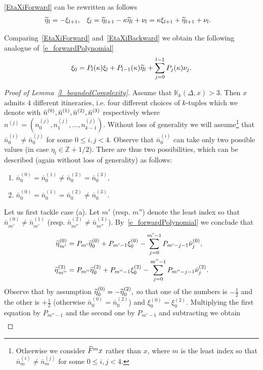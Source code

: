 \documentclass[10pt]{amsart}
\theoremstyle{definition}\newtheorem{defi}[theo]{Definition}\newtheorem{rema}[theo]{Remark}\newtheorem{exam}[theo]{Example}\newtheorem{exem}[theo]{Example}\newtheorem{nota}[theo]{Notation}
\newcommand{\bZ}{\mathbb{Z}}
\newcommand{\LC}{\mathbb{K}}
\newcommand{\nf}{\hat F}
\newcommand{\dn}{\nu}
\newcommand{\indexItinPrivate}[1]{^{(#1)}}
\newcommand{\dnt}[1]{\bar\nu\indexItinPrivate{#1}}
\newcommand{\nt}[1]{\bar n\indexItinPrivate{#1}}
\newcommand{\xit}[1]{\xi\indexItinPrivate{#1}}
\newcommand{\teta}{\tilde\eta}
\newcommand{\tetat}[1]{\teta\indexItinPrivate{#1}}
\newcommand*\DS{\displaystyle}
\newcommand*{\relabel}{\renewcommand{\labelenumi}{(\theenumi)}}
\newcommand*{\alphenumi}{\renewcommand*{\theenumi}{\alph{enumi}}\relabel}
\let\oldtilde\tilde
\renewcommand*{\tilde}[1]{\mathchoice{\widetilde{#1}}{\widetilde{#1}}{\oldtilde{#1}}{\oldtilde{#1}}}
\let\oldhat\hat
\renewcommand*{\hat}[1]{\mathchoice{\widehat{#1}}{\widehat{#1}}{\oldhat{#1}}{\oldhat{#1}}}
\begin{document}
\eqref{EtaXiForward} can be rewritten as follows
\begin{align}\label{EtaXiBackward}
\teta_l&=- \xi_{l+1}, &
\xi_{l}&= \teta_{l+1}-\kappa\teta_l +\dn_l=\kappa\xi_{l+1} +\teta_{l+1}+\dn_l.
\end{align}


Comparing~\eqref{EtaXiForward} and~\eqref{EtaXiBackward} we obtain the following analogue of~\eqref{e_forwardPolynomial}
\begin{align}\label{e_backwardPolynomial}
\xi_0 = P_l(\kappa)\xi_l+P_{l-1}(\kappa)\teta_{l}+\sum_{j = 0}^{l-1}P_j(\kappa)\dn_j.
\end{align}
\begin{proof}[Proof of Lemma~\ref{l_boundedComplexity}]
Assume that $\LC_k(\Delta,x) > 3$. Then $x$ admits $4$ different itineraries, i.e. four different choices of $k$-tuples which we denote with $\nt0,\nt1,\nt2,\linebreak\nt3$ respectively where $\DS n^{(j)}=(n^{(j)}_0, n^{(j)}_1, \dots, n^{(j)}_{k-1}).$ Without loss of generality we will assume\footnote{Otherwise we consider $\nf^mx$ rather than $x$, where $m$ is the least index so that $\nt{i}_m\ne\nt{j}_m$ for some $0 \le i,j < 4$.} that $\nt{i}_0\ne\nt{j}_0$ for some $0 \le i,j < 4$. Observe that $\nt{i}_0$ can take only two possible values (in case $\eta_l\in\bZ+1/2$). There are thus two possibilities, which can be described (again without loss of generality) as follows:
\begin{enumerate}\alphenumi
\item $\nt0_0 = \nt1_0 \ne \nt2_0 = \nt3_0,$
\item $\nt0_0 = \nt1_0 = \nt2_0 \ne \nt3_0.$
\end{enumerate}
Let us first tackle case (a). Let $m'$ (resp. $m''$) denote the least index so that $\nt0_{m'}\ne\nt1_{m'}$ (resp. $\nt2_{m''}\ne\nt3_{m''}$). By~\eqref{e_forwardPolynomial} we conclude that
\begin{align*}
\tetat0_{m'} &= P_{m'}\tetat0_0+P_{m'-1}\xit0_0-\sum_{j = 0}^{m'-1}P_{m'-j-1}\dnt0_j,\\
\tetat2_{m''} &= P_{m''}\tetat2_0+P_{m''-1}\xit2_0-\sum_{j = 0}^{m''-1}P_{m''-j-1}\dnt2_j.
\end{align*}
Observe that by assumption $\tetat0_0 = -\tetat2_0,$ so that one of the numbers is $-\frac{1}{2}$ and the other is $+\frac{1}{2}$ (otherwise $\nt0_0 = \nt 2_0$) and $\xit0_0 = \xit2_0$. Multiplying the first equation by $P_{m''-1}$ and the second one by $P_{m'-1}$ and subtracting we obtain
\begin{align*}

\end{align*}
\end{proof}
\end{document}
